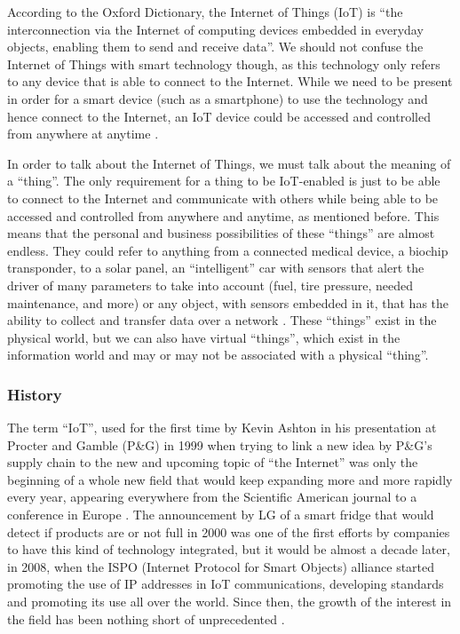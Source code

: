\documentclass[12pt]{article}
\begin{document}
According to the Oxford Dictionary, the Internet of Things (IoT) is “the interconnection via the Internet of computing devices embedded in everyday objects, enabling them to send and receive data”.  We should not confuse the Internet of Things with smart technology though, as this technology only refers to any device that is able to connect to the Internet. While we need to be present in order for a smart device (such as a smartphone) to use the technology and hence connect to the Internet, an IoT device could be accessed and controlled from anywhere at anytime \cite{french2016digital}.\par

In order to talk about the Internet of Things, we must talk about the meaning of a ``thing''. The only requirement for a thing to be IoT-enabled is just to be able to connect to the Internet and communicate with others while being able to be accessed and controlled from anywhere and anytime, as mentioned before. This means that the personal and business possibilities of these ``things'' are almost endless. They could refer to anything from a connected medical device, a biochip transponder, to a solar panel, an ``intelligent'' car with sensors that alert the driver of many parameters to take into account (fuel, tire pressure, needed maintenance, and more) or any object, with sensors embedded in it, that has the ability to collect and transfer data over a network \cite{aeris}. These ``things'' exist in the physical world, but we can also have virtual ``things'', which exist in the information world and may or may not be associated with a physical ``thing''. 

\subsubsection{History}

The term ``IoT'', used for the first time by Kevin Ashton in his presentation at Procter and Gamble (P\&G) in 1999 when trying to link a new idea by P\&G's supply chain to the new and upcoming topic of ``the Internet'' was only the beginning of a whole new field that would keep expanding more and more rapidly every year, appearing everywhere from the Scientific American journal to a conference in Europe \cite{ashton}. The announcement by LG of a smart fridge that would detect if products are or not full in 2000 was one of the first efforts by companies to have this kind of technology integrated, but it would be almost a decade later, in 2008, when the ISPO (Internet Protocol for Smart Objects) alliance started promoting the use of IP addresses in IoT communications, developing standards and promoting its use all over the world. Since then, the growth of the interest in the field has been nothing short of unprecedented \cite{suresh}.\par
\end{document}
